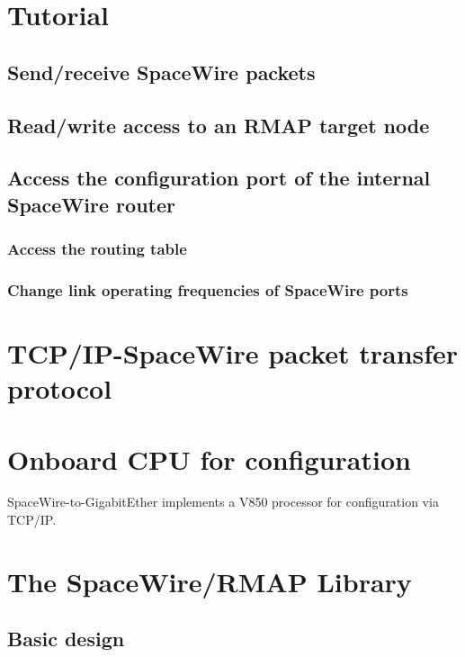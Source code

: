 \documentclass[a4paper,twoside,12pt]{book}
\begin{document}
\chapter{Tutorial}
\section{Send/receive SpaceWire packets}
\section{Read/write access to an RMAP target node}
\section{Access the configuration port of the internal SpaceWire router}
\subsection{Access the routing table}
\subsection{Change link operating frequencies of SpaceWire ports}

\appendix
\chapter{TCP/IP-SpaceWire packet transfer protocol}
\chapter{Onboard CPU for configuration}
SpaceWire-to-GigabitEther implements a V850 processor for configuration via TCP/IP. 
\chapter{The SpaceWire/RMAP Library}

\section{Basic design}
\end{document}
